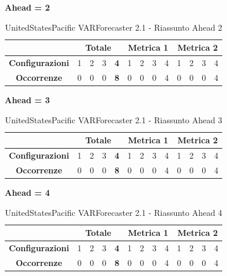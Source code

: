 \documentclass[12pt,a4paper,oneside,openright]{book}
\begin{document}
\medskip
\textbf{Ahead = 2}


\begin{table}[H]
\centering
\begin{tabular}{|c|c|c|c|c|c|c|c|c|c|c|c|c|}
\hline
 & \multicolumn{4}{|c|}{\textbf{Totale}} & \multicolumn{4}{|c|}{\textbf{Metrica 1}} & \multicolumn{4}{|c|}{\textbf{Metrica 2}} \\
\hline
\textbf{Configurazioni} & 1 & 2 & 3 & \textbf{4} & 1 & 2 & 3 & 4 & 1 & 2 & 3 & 4 \\
\hline
\textbf{Occorrenze} & 0 & 0 & 0 & \textbf{8} & 0 & 0 & 0 & 4 & 0 & 0 & 0 & 4\\
\hline
\end{tabular}
\caption{UnitedStatesPacific VARForecaster 2.1 - Riassunto Ahead 2}
\end{table}

\medskip
\textbf{Ahead = 3}


\begin{table}[H]
\centering
\begin{tabular}{|c|c|c|c|c|c|c|c|c|c|c|c|c|}
\hline
 & \multicolumn{4}{|c|}{\textbf{Totale}} & \multicolumn{4}{|c|}{\textbf{Metrica 1}} & \multicolumn{4}{|c|}{\textbf{Metrica 2}} \\
\hline
\textbf{Configurazioni} & 1 & 2 & 3 & \textbf{4} & 1 & 2 & 3 & 4 & 1 & 2 & 3 & 4 \\
\hline
\textbf{Occorrenze} & 0 & 0 & 0 & \textbf{8} & 0 & 0 & 0 & 4 & 0 & 0 & 0 & 4\\
\hline
\end{tabular}
\caption{UnitedStatesPacific VARForecaster 2.1 - Riassunto Ahead 3}
\end{table}

\medskip
\textbf{Ahead = 4}


\begin{table}[H]
\centering
\begin{tabular}{|c|c|c|c|c|c|c|c|c|c|c|c|c|}
\hline
 & \multicolumn{4}{|c|}{\textbf{Totale}} & \multicolumn{4}{|c|}{\textbf{Metrica 1}} & \multicolumn{4}{|c|}{\textbf{Metrica 2}} \\
\hline
\textbf{Configurazioni} & 1 & 2 & 3 & \textbf{4} & 1 & 2 & 3 & 4 & 1 & 2 & 3 & 4 \\
\hline
\textbf{Occorrenze} & 0 & 0 & 0 & \textbf{8} & 0 & 0 & 0 & 4 & 0 & 0 & 0 & 4\\
\hline
\end{tabular}
\caption{UnitedStatesPacific VARForecaster 2.1 - Riassunto Ahead 4}
\end{table}
\end{document}
